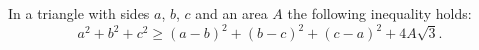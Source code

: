 \documentclass[12pt]{article}
\begin{document}
In a triangle with sides $a$, $b$, $c$ and an area $A$ the following inequality holds:
$$a^2+b^2+c^2\geq (a-b)^2+(b-c)^2+(c-a)^2 +4A\sqrt{3}.$$
\end{document}

